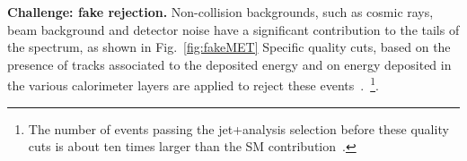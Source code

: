 \begin{textbox}[!h]
\textbf{Challenge: fake \MET rejection.} 
Non-collision backgrounds, such as cosmic rays, beam background and detector noise have a significant contribution to the tails of the \MET spectrum, as shown in Fig.~\ref{fig:fakeMET}
Specific quality cuts, based on the presence of tracks associated to the deposited energy and on energy deposited in the various calorimeter layers are applied to reject these events~\cite{ATLAS-CONF-2015-029}.~\footnote{The number of events passing the jet+\MET analysis selection before these quality cuts is about ten times larger than the SM contribution~\cite{Aaboud:2016tnv}.}. 
\end{textbox}







